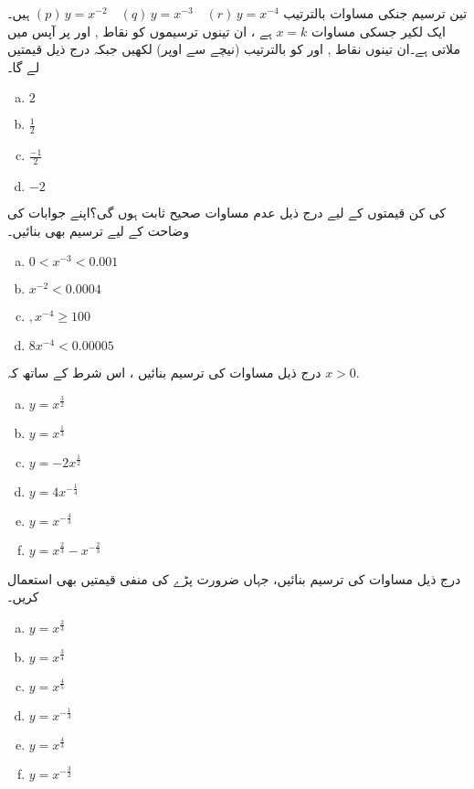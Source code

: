 تین ترسیم جنکی مساوات بالترتیب
 \((p)\,y=x^{-2}\quad (q)\,y=x^{-3}\quad (r)\,y=x^{-4}\) 
ہیں۔ایک لکیر  جسکی مساوات \(x=k\)  ہے ، ان تینوں ترسیموں کو نقاط ,  اور   پر آپس میں ملاتی ہے۔ان تینوں نقاط ,  اور   کو بالترتیب (نیچے سے اوپر) لکھیں جبکہ   درج ذیل قیمتیں لے گا۔
\begin{multicols}{2}
\begin{enumerate}[a.]
\item \(  2\)
\item \( \frac{1}{2} \)
\item \( \frac{-1}{2} \)
\item \( -2 \)
\end{enumerate}
\end{multicols}
 کی کن قیمتوں کے لیے درج ذیل عدم مساوات صحیح ثابت ہوں گی؟اپنے جوابات کی وضاحت کے لیے ترسیم بھی بنائیں۔
\begin{multicols}{2}
\begin{enumerate}[a.]
\item \( 0<x^{-3}<0.001 \)
\item \( x^{-2}<0.0004 \)
\item \( ,x^{-4}\ge 100 \)
\item \( 8x^{-4}<0.00005 \)
\end{enumerate}
\end{multicols}
درج ذیل مساوات کی ترسیم بنائیں ، اس شرط کے ساتھ کہ  \(x>0  \).
\begin{multicols}{3}
\begin{enumerate}[a.]
\item \( y=x^{\frac{3}{2}} \)
\item \(y=x^{\frac{1}{3}}  \)
\item \( y=-2x^{\frac{1}{2}}  \)
\item \(y=4x^{-\frac{1}{4}}  \)
\item \(  y=x^{-\frac{4}{3}}\)
\item \(  y=x^{\frac{2}{3}}-x^{-\frac{2}{3}}\)
\end{enumerate}
\end{multicols}
درج ذیل مساوات کی ترسیم بنائیں، جہاں ضرورت پڑے  کی منفی قیمتیں بھی استعمال کریں۔
\begin{multicols}{3}
\begin{enumerate}[a.]
\item \(  y=x^{\frac{2}{3}}\)
\item \( y=x^{\frac{3}{4}} \)
\item \( y=x^{\frac{4}{5}} \)
\item \( y=x^{-\frac{1}{3}} \)
\item \( y=x^{\frac{4}{3}} \)
\item \(  y=x^{-\frac{3}{2}} \)
\end{enumerate}
\end{multicols}
